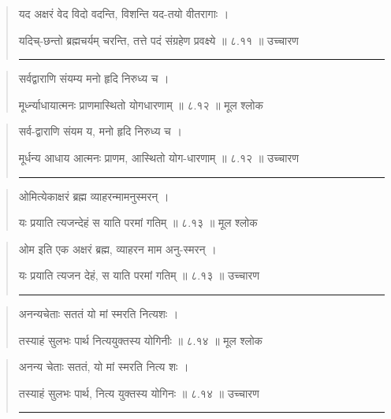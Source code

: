 \begin{quotation}

यद अक्षरं वेद विदो वदन्ति, 
विशन्ति यद-तयो वीतरागाः  ।  

यदिच्-छन्तो ब्रह्मचर्यम् चरन्ति, 
तत्ते पदं संग्रहेण प्रवक्ष्ये  ॥ ८.११ ॥  उच्चारण

\noindent\rule{16cm}{0.4pt} 
\end{quotation}


\begin{quotation} 

सर्वद्वाराणि संयम्य मनो हृदि निरुध्य च  ।  

मूर्ध्न्याधायात्मनः प्राणमास्थितो योगधारणाम्‌  ॥ ८.१२ ॥  मूल श्लोक
\end{quotation}

\begin{quotation}

सर्व-द्वाराणि संयम य, मनो हृदि निरुध्य च  ।  

मूर्धन्य आधाय आत्मनः प्राणम, आस्थितो योग-धारणाम्‌  ॥ ८.१२ ॥  उच्चारण

\noindent\rule{16cm}{0.4pt} 
\end{quotation}


\begin{quotation} 

ओमित्येकाक्षरं ब्रह्म व्याहरन्मामनुस्मरन्‌  ।  

यः प्रयाति त्यजन्देहं स याति परमां गतिम्‌  ॥ ८.१३ ॥  मूल श्लोक
\end{quotation}

\begin{quotation}

ओम इति एक अक्षरं ब्रह्म, व्याहरन माम अनु-स्मरन्‌  ।  

यः प्रयाति त्यजन देहं, स याति परमां गतिम्‌  ॥ ८.१३ ॥  उच्चारण

\noindent\rule{16cm}{0.4pt} 
\end{quotation}


\begin{quotation} 

अनन्यचेताः सततं यो मां स्मरति नित्यशः  ।  

तस्याहं सुलभः पार्थ नित्ययुक्तस्य योगिनीः  ॥ ८.१४ ॥  मूल श्लोक
\end{quotation}

\begin{quotation}

अनन्य चेताः सततं, यो मां स्मरति नित्य शः  ।  

तस्याहं सुलभः पार्थ, नित्य युक्तस्य योगिनः  ॥ ८.१४ ॥  उच्चारण

\noindent\rule{16cm}{0.4pt} 
\end{quotation}


